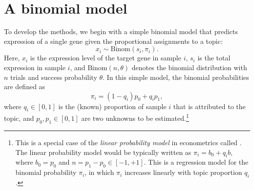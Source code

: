 \documentclass[final]{siamart171218}
\begin{document}
\section{A binomial model}

To develop the methods, we begin with a simple binomial model that
predicts expression of a single gene given the proportional
assignments to a topic:
\begin{equation}
x_i \sim \mathrm{Binom}(s_i, \pi_i).
\label{eq:binomial}
\end{equation}
Here, $x_i$ is the expression level of the target gene in sample $i$,
$s_i$ is the total expression in sample $i$, and $\mathrm{Binom}(n,
\theta)$ denotes the binomial distribution with $n$ trials and success
probability $\theta$. In this simple model, the binomial probabilities
are defined as
\begin{equation}
\pi_i = (1 - q_i) p_0 + q_i p_1,
\label{eq:binomial-prob}
\end{equation}
where $q_i \in [0,1]$ is the (known) proportion of sample $i$ that is
attributed to the topic, and $p_0, p_1 \in [0, 1]$ are two unknowns to
be estimated.\footnote{This is a special case of the {\em linear
    probability model} in econometrics called \cite{stock-watson}. The
  linear probability model would be typically written as $\pi_i = b_0
  + q_i b$, where $b_0 = p_0$ and $n = p_1 - p_0 \in [-1, +1]$. This
  is a regression model for the binomial probability $\pi_i$, in which
  $\pi_i$ increases linearly with topic proportion $q_i$.}
\end{document}
